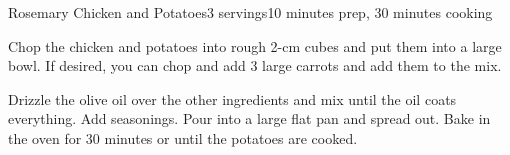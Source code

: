 \documentclass[../Cookbook.tex]{subfiles}
\begin{document}
\begin{recipe}{Rosemary Chicken and Potatoes}{3 servings}{10 minutes prep, 30 minutes cooking}


Chop the chicken and potatoes into rough 2-cm cubes and put them into a large bowl. If desired, you can chop and add 3 large carrots and add them to the mix.

Drizzle the olive oil over the other ingredients and mix until the oil coats everything. Add seasonings. Pour into a large flat pan and spread out. Bake in the oven for 30 minutes or until the potatoes are cooked.


\end{recipe}
\end{document}
